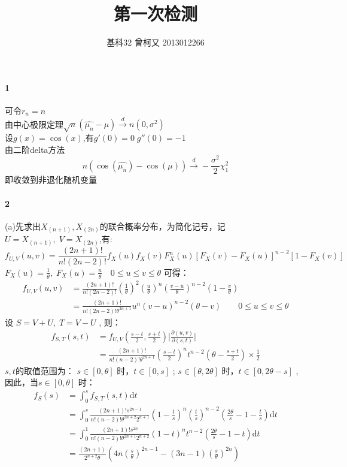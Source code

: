 \documentclass[11pt,a4paper]{ctexart}
\title{第一次检测}
\author{基科32 曾柯又 2013012266}
\date{\vspace{-5ex}}
\begin{document}
\abovedisplayskip=5pt
\belowdisplayskip=5pt
\abovedisplayshortskip=0pt
\belowdisplayshortskip=0pt
\maketitle
\paragraph{1}
可令$r_n = n$\\
由中心极限定理$\sqrt{n}(\hat{\mu_n} - \mu) \overset{d}{\to} n(0,\sigma^2)$\\
设\(g(x) = \cos(x)\),有\( g'(0) = 0 \; g''(0) = -1\)\\
由二阶delta方法\[ n(\cos(\hat{\mu_n}) - \cos(\mu) ) \overset{d}{\to} -\frac{\sigma^2}{2}\chi^2_1 \]
即收敛到非退化随机变量
 \paragraph{2}
(a)先求出\(X_{(n+1)} , X_{(2n)}\)的联合概率分布，为简化记号，记\(U = X_{(n+1)},\;V = X_{(2n)}\),有:
 \[ f_{U,V}(u,v) = \frac{(2n + 1)!}{n!(2n - 2)!}f_X(u)f_X(v)F_X^n(u)[F_X(v) - F_X(u)]^{n - 2}[1 - F_X(v)]\]
 \(F_X(u) = \frac{1}{\theta},\;F_X(u) = \frac{u}{\theta}\quad 0 \leq u \leq v \leq \theta\)  可得：
 \begin{equation*}
\begin{split}
f_{U,V}(u,v) & = \frac{(2n + 1)!}{n!(2n - 2)!}(\frac{1}{\theta})^2(\frac{u}{\theta})^n(\frac{v - u}{\theta})^{n - 2}(1 -\frac{v}{\theta} )\\
& = \frac{(2n + 1)!}{n!(2n - 2)!\theta^{2n + 1}}u^n(v - u)^{n - 2}(\theta - v)  \qquad 0 \leq u \leq v \leq \theta 
\end{split}
 \end{equation*}
 设 \(S =  V + U ,\; T = V - U\) , 则：
 \begin{equation*}
 \begin{split}
 f_{S,T}(s,t) & = f_{U,V}(\frac{s - t}{2},\frac{s + t}{2})\Big|\frac{\partial(u,v)}{\partial(s,t)}\Big|\\
 & = \frac{(2n + 1)!}{n!(n-2)!\theta^{2n + 1}}(\frac{s - t}{2})^nt^{n - 2}(\theta - \frac{s + t}{2})\times\frac{1}{2}
 \end{split}
 \end{equation*}
 $s,t$的取值范围为： 
\(s \in [0, \theta]\) 时，\( t \in [0,s]\) ; \(s \in [\theta, 2\theta]\) 时，\( t \in [0,2\theta - s]\) ,因此，当\(s \in [0, \theta]\) 时：
\begin{equation*}
\begin{split}
f_S(s) & = \int_{0}^{s}f_{S,T}(s,t)\mathrm{d}t \\
&= \int_{0}^{s}\frac{(2n + 1)!s^{2n - 1}}{n!(n-2)!\theta^{2n + 2}2^{n + 1}}(1 - \frac{t}{s})^n(\frac{t}{s})^{n - 2}(\frac{2\theta}{s} - 1 -  \frac{t}{s})\mathrm{d}t\\
& = \int_{0}^{1}\frac{(2n + 1)!s^{2n}}{n!(n-2)!\theta^{2n + 1}2^{n + 2}}(1 - t)^nt^{n - 2}(\frac{2\theta}{s} - 1 -  t)\mathrm{d}t\\
& = \frac{(2n + 1)}{2^{n + 2}\theta}(4n(\frac{s}{\theta})^{2n - 1} - (3n - 1)(\frac{s}{\theta})^{2n})
\end{split}
\end{equation*}
\end{document}
